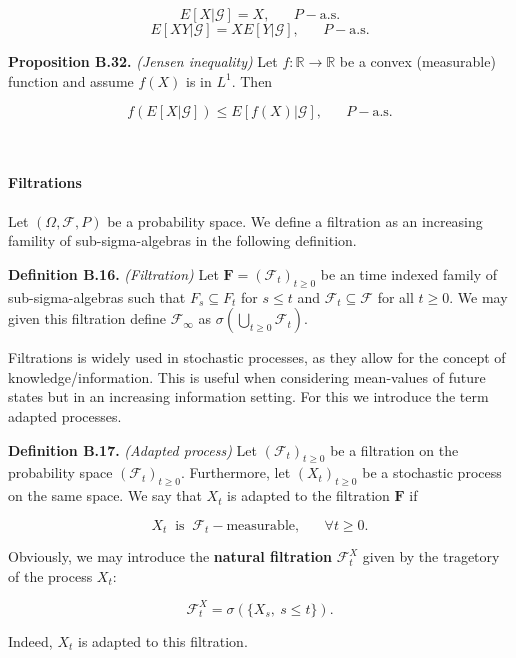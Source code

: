\documentclass[
]{article}
\begin{document}
\[E[X\vert\mathcal{G}]=X,\hspace{20pt}P-\text{a.s.}\]
\[E[XY\vert\mathcal{G}]=XE[Y\vert\mathcal{G}],\hspace{20pt}P-\text{a.s.}\]

\textbf{Proposition B.32.} \emph{(Jensen inequality)} Let
\(f:\mathbb{R}\to\mathbb{R}\) be a convex (measurable) function and
assume \(f(X)\) is in \(L^1\). Then

\[f(E[X\vert\mathcal{G}])\le E[f(X)\vert\mathcal{G}],\hspace{20pt}P-\text{a.s.}\]

~

\hypertarget{filtrations}{%
\paragraph{Filtrations}\label{filtrations}}

Let \((\Omega,\mathcal{F},P)\) be a probability space. We define a
filtration as an increasing famility of sub-sigma-algebras in the
following definition.

\textbf{Definition B.16.} \emph{(Filtration)} Let
\(\mathbf{F}=(\mathcal{F}_t)_{t\ge 0}\) be an time indexed family of
sub-sigma-algebras such that \(F_s\subseteq F_t\) for \(s\le t\) and
\(\mathcal{F}_t\subseteq \mathcal{F}\) for all \(t\ge 0\). We may given
this filtration define \(\mathcal{F}_\infty\) as
\(\sigma\left(\bigcup_{t\ge 0}\mathcal{F}_t\right)\).

Filtrations is widely used in stochastic processes, as they allow for
the concept of knowledge/information. This is useful when considering
mean-values of future states but in an increasing information setting.
For this we introduce the term adapted processes.

\textbf{Definition B.17.} \emph{(Adapted process)} Let
\((\mathcal{F}_t)_{t\ge 0}\) be a filtration on the probability space
\((\mathcal{F}_t)_{t\ge 0}\). Furthermore, let \((X_t)_{t\ge 0}\) be a
stochastic process on the same space. We say that \(X_t\) is adapted to
the filtration \(\mathbf{F}\) if

\[X_t\ \text{ is }\ \mathcal{F}_t-\text{measurable},\hspace{20pt}\forall t\ge 0.\]

Obviously, we may introduce the \textbf{natural filtration}
\(\mathcal{F}^X_t\) given by the tragetory of the process \(X_t\):

\[\mathcal{F}^X_t=\sigma(\{X_s,\ s\le t\}).\]

Indeed, \(X_t\) is adapted to this filtration.
\end{document}

